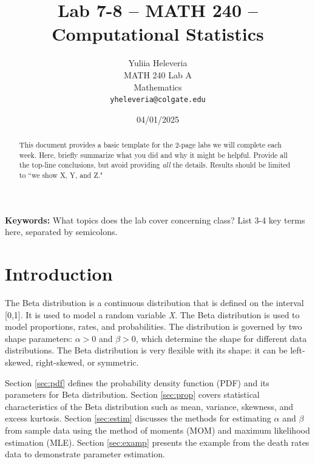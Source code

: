 \documentclass{article}\usepackage[]{graphicx}\usepackage[]{xcolor}
\begin{document}
\vspace{-1in}
\title{Lab 7-8 -- MATH 240 -- Computational Statistics}

\author{
  Yuliia Heleveria \\
  MATH 240 Lab A  \\
  Mathematics  \\
  {\tt yheleveria@colgate.edu}
}

\date{04/01/2025}

\maketitle

\begin{multicols}{2}
 \raggedcolumns
\begin{abstract}
This document provides a basic template for the 2-page labs we will complete each week. Here, briefly summarize what you did and why it might be helpful. Provide all the top-line conclusions, but avoid providing \emph{all} the details. Results should be limited to ``we show X, Y, and Z."
\end{abstract}

\noindent \textbf{Keywords:} What topics does the lab cover concerning class? List 3-4 key terms here, separated by semicolons.

\section{Introduction}
The Beta distribution is a continuous distribution that is defined on the interval [0,1]. It is used to model a random variable \textit{X}. The Beta distribution is used to model proportions, rates, and probabilities. The distribution is governed by two shape parameters: $\alpha > 0$ and $\beta > 0$, which determine the shape for different data distributions. The Beta distribution is very flexible with its shape: it can be left-skewed, right-skewed, or symmetric. 


Section \ref{sec:pdf} defines the probability density function (PDF) and its parameters for Beta distribution. Section \ref{sec:prop} covers statistical characteristics of the Beta distribution such as mean, variance, skewness, and excess kurtosis. Section \ref{sec:estim} discusses the methods for estimating $\alpha$ and $\beta$ from sample data using the method of moments (MOM) and maximum likelihood estimation (MLE). Section \ref{sec:examp} presents the example from the death rates data to demonstrate parameter estimation.




\end{multicols}
\end{document}
